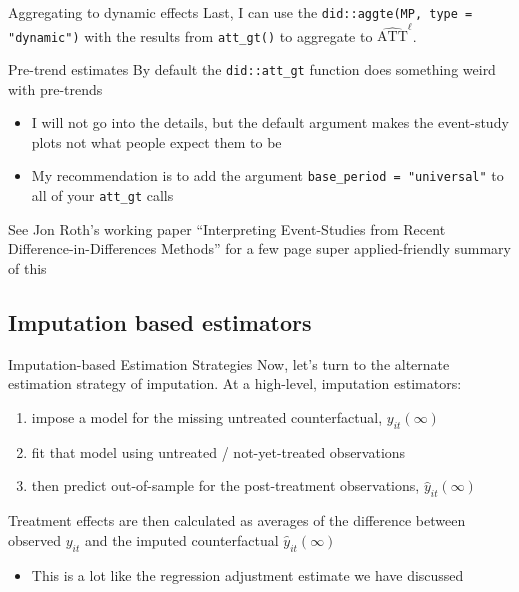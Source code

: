 \documentclass[aspectratio=169,t,11pt,table]{beamer}
\begin{document}
\begin{frame}{Aggregating to dynamic effects}
  Last, I can use the \texttt{did::aggte(MP, type = "dynamic")} with the results from \texttt{att\_gt()} to aggregate to $\hat{\text{ATT}}^\ell$.
\end{frame}


\begin{frame}{Pre-trend estimates}
  By default the \texttt{did::att\_gt} function does something weird with pre-trends
  \begin{itemize}
    \item I will not go into the details, but the default argument makes the event-study plots not what people expect them to be
    
    \item My recommendation is to add the argument \texttt{base\_period = "universal"} to all of your \texttt{att\_gt} calls
  \end{itemize}

  \bigskip
  See Jon Roth's working paper ``Interpreting Event-Studies from Recent Difference-in-Differences Methods'' for a few page super applied-friendly summary of this
\end{frame}



\subsection{Imputation based estimators}

\begin{frame}{Imputation-based Estimation Strategies}
  Now, let's turn to the alternate estimation strategy of imputation. At a high-level, imputation estimators:
  \begin{enumerate}
    \item impose a model for the missing untreated counterfactual, $y_{it}(\infty)$
    \item fit that model using untreated / not-yet-treated observations

    \item then predict out-of-sample for the post-treatment observations, $\hat{y}_{it}(\infty)$
  \end{enumerate} 

  \bigskip
  Treatment effects are then calculated as averages of the difference between observed $y_{it}$ and the imputed counterfactual $\hat{y}_{it}(\infty)$
  \begin{itemize}
    \item This is a lot like the regression adjustment estimate we have discussed
  \end{itemize}
\end{frame}
\end{document}
